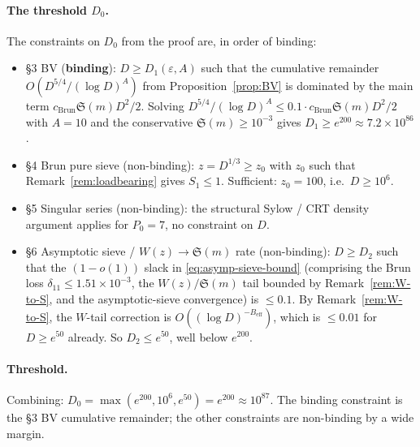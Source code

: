 \paragraph{The threshold $D_{0}$.}
The constraints on $D_{0}$ from the proof are, in order of binding:
\begin{itemize}
  \item \S3 BV (\textbf{binding}): $D \geq D_{1}(\varepsilon, A)$ such
    that the cumulative remainder $O(D^{5/4} / (\log D)^{A})$ from
    Proposition~\ref{prop:BV} is dominated by the main term
    $c_{\mathrm{Brun}} \mathfrak{S}(m) D^{2} / 2$. Solving
    $D^{5/4} / (\log D)^{A} \leq 0.1 \cdot c_{\mathrm{Brun}}
    \mathfrak{S}(m) D^{2} / 2$ with $A = 10$ and the conservative
    $\mathfrak{S}(m) \geq 10^{-3}$ gives $D_{1} \geq e^{200} \approx
    7.2 \times 10^{86}$.
  \item \S4 Brun pure sieve (non-binding): $z = D^{1/3} \geq z_{0}$
    with $z_{0}$ such that Remark~\ref{rem:loadbearing} gives $S_{1}
    \leq 1$. Sufficient: $z_{0} = 100$, i.e.\ $D \geq 10^{6}$.
  \item \S5 Singular series (non-binding): the structural
    Sylow / CRT density argument applies for $P_{0} = 7$, no constraint
    on $D$.
  \item \S6 Asymptotic sieve / $W(z) \to \mathfrak{S}(m)$ rate
    (non-binding): $D \geq D_{2}$ such that the $(1 - o(1))$ slack in
    \eqref{eq:asymp-sieve-bound} (comprising the Brun loss
    $\delta_{11} \leq 1.51 \times 10^{-3}$, the $W(z) /
    \mathfrak{S}(m)$ tail bounded by Remark~\ref{rem:W-to-S}, and the
    asymptotic-sieve convergence) is $\leq 0.1$. By
    Remark~\ref{rem:W-to-S}, the $W$-tail correction is
    $O((\log D)^{-B_{\mathrm{eff}}})$, which is $\leq 0.01$ for $D
    \geq e^{50}$ already. So $D_{2} \leq e^{50}$, well below $e^{200}$.
\end{itemize}

\paragraph{Threshold.} Combining: $D_{0} = \max(e^{200}, 10^{6},
e^{50}) = e^{200} \approx 10^{87}$. The binding constraint is the
\S3 BV cumulative remainder; the other constraints are non-binding by
a wide margin.

